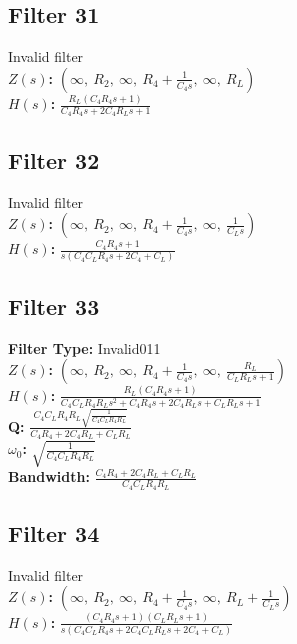 \documentclass{article}
\begin{document}
\subsection*{Filter 31}
Invalid filter \\ 
\textbf{$Z(s)$:} $\left( \infty, \  R_{2}, \  \infty, \  R_{4} + \frac{1}{C_{4} s}, \  \infty, \  R_{L}\right)$ \\ 
\textbf{$H(s)$:} $\frac{R_{L} \left(C_{4} R_{4} s + 1\right)}{C_{4} R_{4} s + 2 C_{4} R_{L} s + 1}$ \\ 
\subsection*{Filter 32}
Invalid filter \\ 
\textbf{$Z(s)$:} $\left( \infty, \  R_{2}, \  \infty, \  R_{4} + \frac{1}{C_{4} s}, \  \infty, \  \frac{1}{C_{L} s}\right)$ \\ 
\textbf{$H(s)$:} $\frac{C_{4} R_{4} s + 1}{s \left(C_{4} C_{L} R_{4} s + 2 C_{4} + C_{L}\right)}$ \\ 
\subsection*{Filter 33}
\textbf{Filter Type:} Invalid011 \\ 
\textbf{$Z(s)$:} $\left( \infty, \  R_{2}, \  \infty, \  R_{4} + \frac{1}{C_{4} s}, \  \infty, \  \frac{R_{L}}{C_{L} R_{L} s + 1}\right)$ \\ 
\textbf{$H(s)$:} $\frac{R_{L} \left(C_{4} R_{4} s + 1\right)}{C_{4} C_{L} R_{4} R_{L} s^{2} + C_{4} R_{4} s + 2 C_{4} R_{L} s + C_{L} R_{L} s + 1}$ \\ 
\textbf{Q:} $\frac{C_{4} C_{L} R_{4} R_{L} \sqrt{\frac{1}{C_{4} C_{L} R_{4} R_{L}}}}{C_{4} R_{4} + 2 C_{4} R_{L} + C_{L} R_{L}}$ \\ 
\textbf{$\omega_0$:} $\sqrt{\frac{1}{C_{4} C_{L} R_{4} R_{L}}}$ \\ 
\textbf{Bandwidth:} $\frac{C_{4} R_{4} + 2 C_{4} R_{L} + C_{L} R_{L}}{C_{4} C_{L} R_{4} R_{L}}$ \\ 
\subsection*{Filter 34}
Invalid filter \\ 
\textbf{$Z(s)$:} $\left( \infty, \  R_{2}, \  \infty, \  R_{4} + \frac{1}{C_{4} s}, \  \infty, \  R_{L} + \frac{1}{C_{L} s}\right)$ \\ 
\textbf{$H(s)$:} $\frac{\left(C_{4} R_{4} s + 1\right) \left(C_{L} R_{L} s + 1\right)}{s \left(C_{4} C_{L} R_{4} s + 2 C_{4} C_{L} R_{L} s + 2 C_{4} + C_{L}\right)}$ \\ 
\end{document}
